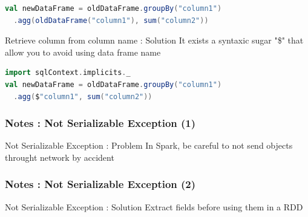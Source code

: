 \documentclass[slidetop,9pt,utf8]{beamer}
\begin{document}
\begin{CJK}{UTF8}{gbsn}
\begin{frame}[fragile]
  \begin{lstlisting}[label=columnNameProblem, caption=Use the name of the data frame containing the column to retrieve column, language=scala, style=code]
val newDataFrame = oldDataFrame.groupBy("column1")
  .agg(oldDataFrame("column1"), sum("column2"))
  \end{lstlisting}

  \begin{exampleblock}{Retrieve column from column name : Solution}
    It exists a syntaxic sugar "\$" that allow you to avoid using data frame name
  \end{exampleblock}

  \begin{lstlisting}[label=changeNameSelectedColumn, caption=Use "\$" and retrieve directly column from column name, language=scala, style=code]
import sqlContext.implicits._
val newDataFrame = oldDataFrame.groupBy("column1")
  .agg($"column1", sum("column2"))
  \end{lstlisting}

\end{frame}

\begin{frame}[fragile]
  \frametitle{Notes : Not Serializable Exception (1)}

  \begin{exampleblock}{Not Serializable Exception : Problem}
    In Spark, be careful to not send objects throught network by accident
  \end{exampleblock}

  

\end{frame}


\begin{frame}[fragile]
  \frametitle{Notes : Not Serializable Exception (2)}

  \begin{exampleblock}{Not Serializable Exception : Solution}
    Extract fields before using them in a RDD
  \end{exampleblock}

  


\end{frame}
\end{CJK}
\end{document}
